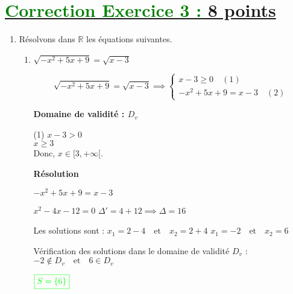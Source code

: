 \documentclass[12pt,a4paper]{article}
\begin{document}
\section*{\underline{\textcolor{green}{Correction Exercice 3 :} 8 points}}
\begin{enumerate}
    \item Résolvons dans $\mathbb{R}$ les équations suivantes.
    \begin{enumerate}
        \item $\sqrt{-x^2 + 5x + 9} = \sqrt{x - 3}$
        
\[
\sqrt{-x^2 + 5x + 9} = \sqrt{x-3}\implies
\begin{cases}
x - 3 \geq 0 \quad (1) \\
-x^2 + 5x + 9 =x-3 \quad (2)
\end{cases}
\]

\textbf{Domaine de validité : \( D_v \)}

(1) \( x - 3 > 0 \)  \\
   \(
   x \geq 3
   \)\\
   Donc, \( x \in [3, +\infty[ \).

\textbf{Résolution}
 
\(
-x^2 + 5x + 9 = x - 3
\)
 
\(
x^2 - 4x - 12 = 0
\)
\(
\Delta' = 4 + 12 \implies \Delta = 16
\)

Les solutions sont :  
\(
x_1 = 2 - 4 \quad \text{et} \quad x_2 = 2 + 4
\)
\(
x_1 = -2 \quad \text{et} \quad x_2 = 6
\)

\noindent Vérification des solutions dans le domaine de validité \( D_v \) :  
\(
-2 \notin D_v \quad \text{et} \quad 6 \in D_v
\)

\(
\textcolor{green}{\boxed{S = \{ 6 \}  }} 
\)
    \end{enumerate} 
\end{enumerate}
\end{document}
